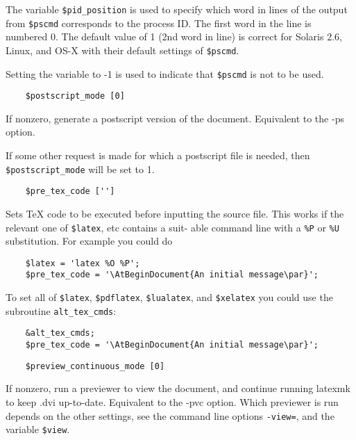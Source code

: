 The  variable  \verb|$pid_position|  is  used  to specify which word in
lines of the output from \verb|$pscmd| corresponds to the  process  ID.
The  first word in the line is numbered 0.  The default value of
1 (2nd word in line) is correct for Solaris 2.6, Linux, and OS-X
with their default settings of \verb|$pscmd|.

Setting  the  variable  to -1 is used to indicate that \verb|$pscmd| is
not to be used.

\begin{verbatim}
	$postscript_mode [0]
\end{verbatim}

If nonzero, generate  a  postscript  version  of  the  document.
Equivalent to the -ps option.

If  some  other  request  is made for which a postscript file is
needed, then \verb|$postscript_mode| will be set to 1.

\begin{verbatim}
	$pre_tex_code ['']
\end{verbatim}

Sets TeX code to be executed before inputting the  source  file.
This  works  if the relevant one of \verb|$latex|, etc contains a suit-
able command line with a \verb|%P| or \verb|%U| substitution.  For example you
could do

\begin{verbatim}
	$latex = 'latex %O %P';
	$pre_tex_code = '\AtBeginDocument{An initial message\par}';
\end{verbatim}

To  set  all  of  \verb|$latex|, \verb|$pdflatex|, \verb|$lualatex|, and
\verb|$xelatex| you could use the subroutine \verb|alt_tex_cmds|:

\begin{verbatim}
	&alt_tex_cmds;
	$pre_tex_code = '\AtBeginDocument{An initial message\par}';
\end{verbatim}

\begin{verbatim}
	$preview_continuous_mode [0]
\end{verbatim}

If nonzero, run a previewer to view the document,  and  continue
running latexmk to keep .dvi up-to-date.  Equivalent to the -pvc
option.  Which previewer is run depends on the  other  settings,
see the command line options \verb|-view=|, and the variable \verb|$view|.

